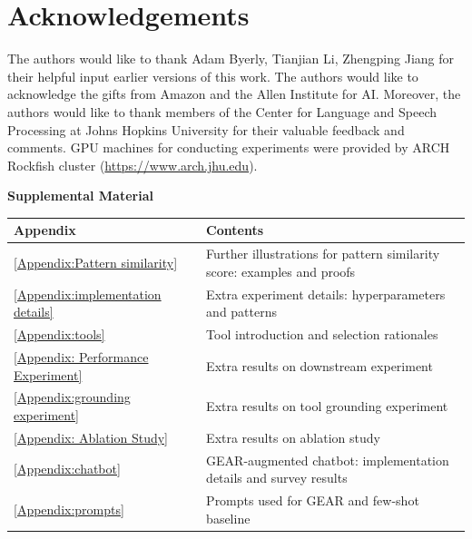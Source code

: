 \documentclass[11pt]{article}
\newcommand{\name}{{\fontfamily{cmss}\selectfont GEAR}}
\begin{document}
\section*{Acknowledgements}

The authors would like to thank Adam Byerly, Tianjian Li, Zhengping Jiang for their helpful input earlier versions of this work. 
The authors would like to acknowledge the gifts from Amazon and the Allen Institute for AI. 
Moreover, the authors would like to thank members of the Center for Language and Speech Processing at Johns Hopkins University for their valuable feedback and comments.
GPU machines for conducting experiments were provided by ARCH Rockfish cluster (\url{https://www.arch.jhu.edu}).





\onecolumn

\clearpage
\appendix
\begin{center}
{\LARGE \textbf{Supplemental Material}}
\end{center}

\begin{center}
\begin{tabular}{@{}ll@{}}
\toprule
Appendix & Contents \\ \midrule
\autoref{Appendix:Pattern similarity}       & Further illustrations for pattern similarity score: examples and proofs        \\
\autoref{Appendix:implementation details}        & Extra experiment details: hyperparameters and patterns        \\
\autoref{Appendix:tools}       & Tool introduction and selection rationales       \\
\autoref{Appendix: Performance Experiment}        &  Extra results on downstream experiment         \\
\autoref{Appendix:grounding experiment}        & Extra results on tool grounding experiment        \\
\autoref{Appendix: Ablation Study}        &   Extra results on ablation study       \\ 
\autoref{Appendix:chatbot}       &  \name{}-augmented chatbot: implementation details and survey results        \\
\autoref{Appendix:prompts}        &  Prompts used for \name{} and few-shot baseline      \\ \midrule
\end{tabular}
\end{center}
\end{document}

